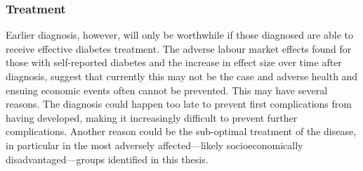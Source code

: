 \subsubsection{Treatment}

Earlier diagnosis, however, will only be worthwhile if those diagnosed are able to receive effective diabetes treatment. The adverse labour market effects found for those with self-reported diabetes and the increase in effect size over time after diagnosis, suggest that currently this may not be the case and adverse health and ensuing economic events often cannot be prevented. This may have several reasons. The diagnosis could happen too late to prevent first complications from having developed, making it increasingly difficult to prevent further complications. Another reason could be the sub-optimal treatment of the disease, in particular in the most adversely affected---likely socioeconomically disadvantaged---groups identified in this thesis.

